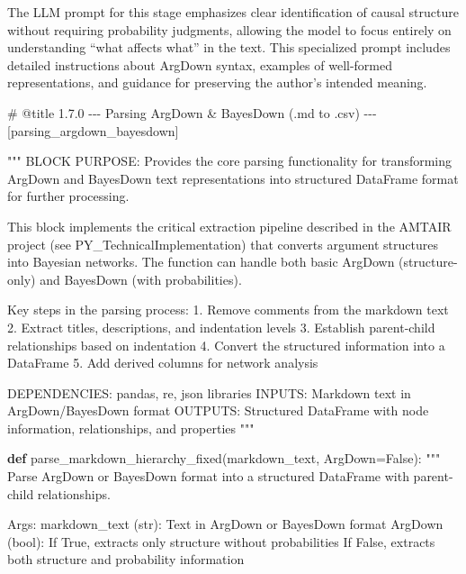 \documentclass[
  11pt,
  letterpaper,
]{book}
\newenvironment{Shaded}{\begin{snugshade}}{\end{snugshade}}
\newcommand{\CommentTok}[1]{\textcolor[rgb]{0.37,0.37,0.37}{#1}}
\newcommand{\KeywordTok}[1]{\textcolor[rgb]{0.00,0.23,0.31}{\textbf{#1}}}
\newcommand{\NormalTok}[1]{\textcolor[rgb]{0.00,0.23,0.31}{#1}}
\newcommand{\OperatorTok}[1]{\textcolor[rgb]{0.37,0.37,0.37}{#1}}
\newcommand{\VariableTok}[1]{\textcolor[rgb]{0.07,0.07,0.07}{#1}}
\begin{document}
The LLM prompt for this stage emphasizes clear identification of causal
structure without requiring probability judgments, allowing the model to
focus entirely on understanding ``what affects what'' in the text. This
specialized prompt includes detailed instructions about ArgDown syntax,
examples of well-formed representations, and guidance for preserving the
author's intended meaning.

\label{parsing_argdown_bayesdown}
\begin{Shaded}
\begin{Highlighting}[]
\CommentTok{\# @title 1.7.0 {-}{-}{-} Parsing ArgDown \& BayesDown (.md to .csv) {-}{-}{-} [parsing\_argdown\_bayesdown]}

\CommentTok{"""}
\CommentTok{BLOCK PURPOSE: Provides the core parsing functionality for transforming ArgDown}
\CommentTok{and BayesDown text representations into structured DataFrame format for further}
\CommentTok{processing.}

\CommentTok{This block implements the critical extraction pipeline described in the AMTAIR}
\CommentTok{project (see PY\_TechnicalImplementation) that converts argument structures}
\CommentTok{into Bayesian networks.}
\CommentTok{The function can handle both basic ArgDown (structure{-}only) and}
\CommentTok{BayesDown (with probabilities).}

\CommentTok{Key steps in the parsing process:}
\CommentTok{1. Remove comments from the markdown text}
\CommentTok{2. Extract titles, descriptions, and indentation levels}
\CommentTok{3. Establish parent{-}child relationships based on indentation}
\CommentTok{4. Convert the structured information into a DataFrame}
\CommentTok{5. Add derived columns for network analysis}

\CommentTok{DEPENDENCIES: pandas, re, json libraries}
\CommentTok{INPUTS: Markdown text in ArgDown/BayesDown format}
\CommentTok{OUTPUTS: Structured DataFrame with node information, relationships, and properties}
\CommentTok{"""}

\KeywordTok{def}\NormalTok{ parse\_markdown\_hierarchy\_fixed(markdown\_text, ArgDown}\OperatorTok{=}\VariableTok{False}\NormalTok{):}
    \CommentTok{"""}
\CommentTok{    Parse ArgDown or BayesDown format into a structured DataFrame with parent{-}child relationships.}

\CommentTok{    Args:}
\CommentTok{        markdown\_text (str): Text in ArgDown or BayesDown format}
\CommentTok{        ArgDown (bool): If True, extracts only structure without probabilities}
\CommentTok{                        If False, extracts both structure and probability information}


\end{Highlighting}
\end{Shaded}
\end{document}
